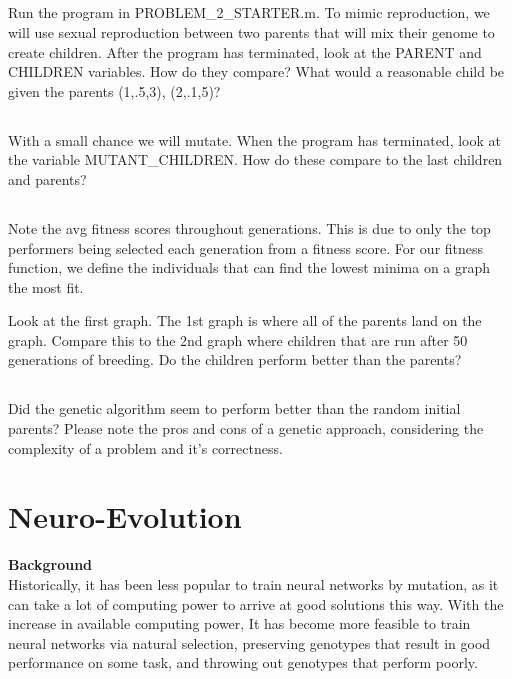 \documentclass[12]{extarticle}
\begin{document}
\subsection{}
 Run the program in PROBLEM\_2\_STARTER.m.  To mimic reproduction, we will use sexual reproduction between two parents that will mix their genome to create children. After the program has terminated, look at the PARENT and CHILDREN variables.  How do they compare?  What would a reasonable child be given the parents (1,.5,3), (2,.1,5)?

\subsection{}
With a small chance we will mutate. When the program has terminated, look at the variable MUTANT\_CHILDREN.  How do these compare to the last children and parents?

\subsection{}
Note the avg fitness scores throughout generations. This is due to only the top performers being selected each generation from a fitness score.  For our fitness function, we define the individuals that can find the lowest minima on a graph the most fit.

Look at the first graph.  The 1st graph is where all of the parents land on the graph. Compare this to the 2nd graph where children that are run after 50 generations of breeding. Do the children perform better than the parents?

\subsection{} Did the genetic algorithm seem to perform better than the random initial parents?  Please note the pros and cons of a genetic approach, considering the complexity of a problem and it’s correctness.


\section{Neuro-Evolution}
\textbf{Background} \\
Historically, it has been less popular to train neural networks by mutation, as it can take a lot of computing power to arrive at good solutions this way. With the increase in available computing power, It has become more feasible to train neural networks via natural selection, preserving genotypes that result in good performance on some task, and throwing out genotypes that perform poorly. 
\end{document}
